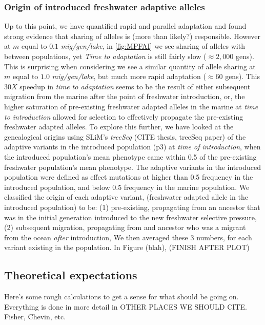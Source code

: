 \documentclass{article}
\newcommand{\plr}[1]{\todo[linecolor=blue,backgroundcolor=blue!25,bordercolor=blue]{#1}}
\begin{document}
\subsubsection*{Origin of introduced freshwater adaptive alleles}
Up to this point, we have quantified rapid and parallel adaptation and found strong evidence that sharing of alleles is (more than likely?) responsible.
However at $m$ equal to $0.1$ \emph{mig/gen/lake}, in \ref{fig:MPFAI} we see sharing of alleles with between populations,
yet \emph{Time to adaptation} is still fairly slow ($\approx 2,000$ gens).
This is surprising when considering we see a similar quantity of allele sharing at  $m$ equal to $1.0$ \emph{mig/gen/lake}, 
but much more rapid adaptation ($\approx 60$ gens). 
This $30X$ speedup in \emph{time to adaptation} seems to be the result of either subsequent migration
from the marine after the point of freshwater introduction, or, the higher saturation of pre-existing freshwater adapted alleles 
in the marine at \emph{time to introduction} allowed for selection to effectively propagate the pre-existing freshwater adapted alleles.
To explore this further, we have looked at the genealogical origins using SLiM's \emph{treeSeq} (CITE thesis, treeSeq paper)
of the adaptive variants in the introduced population (p3) at \emph{time of introduction}, when the introduced population's mean phenotype
came within 0.5 of the pre-existing freshwater population's mean phenotype.
The adaptive variants in the introduced population were defined as effect mutations at higher than 0.5 frequency in the 
introduced population, and below 0.5 frequency in the marine population.
We classified the origin of each adaptive variant, (freshwater adapted allele in the introduced population) to be:
(1) pre-existing, propagating from an ancestor that was in the initial generation introduced to the new freshwater selective pressure,
(2) subsequent migration, propagating from and ancestor who was a migrant from the ocean \emph{after} introduction,
We then averaged these 3 numbers, for each variant existing in the population.
In Figure (blah), (FINISH AFTER PLOT)




 

\subsection*{Theoretical expectations}
\plr{does this go first or second?}

Here's some rough calculations to get a sense for what should be going on.
Everything is done in more detail in OTHER PLACES WE SHOULD CITE.
Fisher, Chevin, etc.
\end{document}
